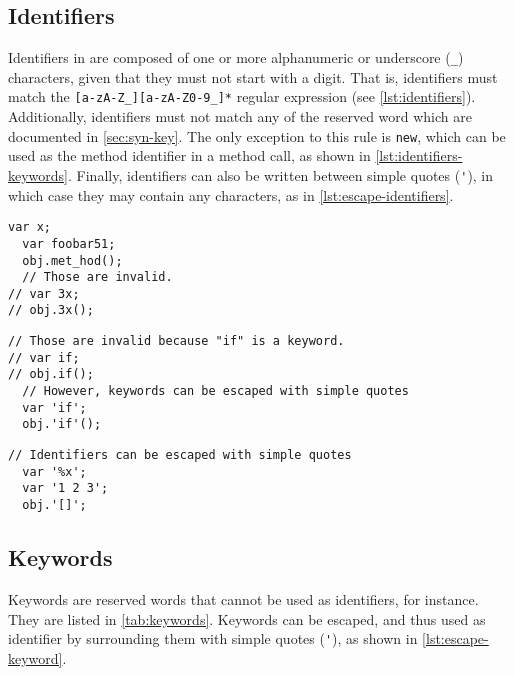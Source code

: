 \documentclass[openright,twoside,12pt]{report}
\begin{document}
\subsection{Identifiers}
\label{sec:us-syn-id}

Identifiers in \us are composed of one or more alphanumeric or
underscore (\lstinline|_|) characters, given that they must not start
with a digit. That is, identifiers must match the
\lstinline|[a-zA-Z_][a-zA-Z0-9_]*| regular expression (see
\autoref{lst:identifiers}).  Additionally, identifiers must not match any of
the \us reserved word which are documented in \autoref{sec:syn-key}. The only
exception to this rule is \lstinline|new|, which can be used as the
method identifier in a method call, as shown in
\autoref{lst:identifiers-keywords}.  Finally, identifiers can also be written
between simple quotes (\lstinline|'|), in which case they may contain
any characters, as in \autoref{lst:escape-identifiers}.

\begin{lstlisting}[caption=Identifiers,label=lst:identifiers,float=\floatpos]
  var x;
  var foobar51;
  obj.met_hod();
  // Those are invalid.
// var 3x;
// obj.3x();
\end{lstlisting}

\begin{lstlisting}[caption=Identifiers cannot be keywords,
  label=lst:identifiers-keywords,float=\floatpos]
  // Those are invalid because "if" is a keyword.
// var if;
// obj.if();
  // However, keywords can be escaped with simple quotes
  var 'if';
  obj.'if'();
\end{lstlisting}

\begin{lstlisting}[caption=Escaping identifiers with simple quotes,
  label=lst:escape-identifiers,float=\floatpos]
  // Identifiers can be escaped with simple quotes
  var '%x';
  var '1 2 3';
  obj.'[]';
\end{lstlisting}

\subsection{Keywords}
\label{sec:syn-key}

Keywords are reserved words that cannot be used as identifiers, for
instance.  They are listed in \autoref{tab:keywords}.  Keywords can be
escaped, and thus used as identifier by surrounding them with simple
quotes (\lstinline|'|), as shown in \autoref{lst:escape-keyword}.
\end{document}
